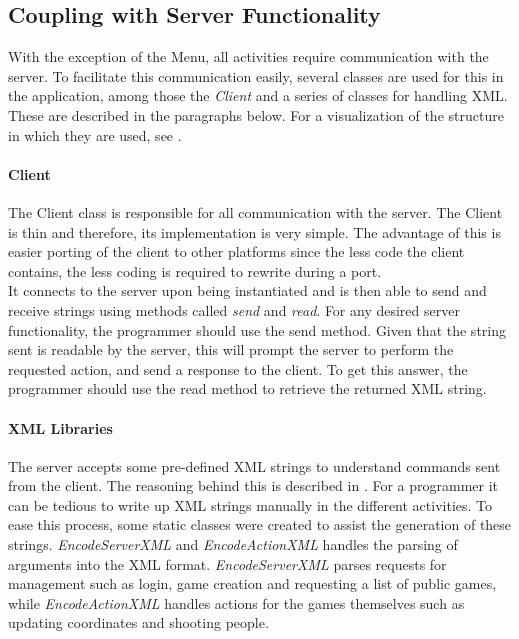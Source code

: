 \subsection{Coupling with Server Functionality} \label{subsec:server-coupling}
With the exception of the Menu, all activities require communication with the server. To facilitate this communication easily, several classes are used for this in the application, among those the \textit{Client} and a series of classes for handling XML. These are described in the paragraphs below. For a visualization of the structure in which they are used, see .

\paragraph{Client}
The Client class is responsible for all communication with the server. The Client is thin and therefore, its implementation is very simple. The advantage of this is easier porting of the client to other platforms since the less code the client contains, the less coding is required to rewrite during a port.\\

It connects to the server upon being instantiated and is then able to send and receive strings using methods called \textit{send} and \textit{read}. For any desired server functionality, the programmer should use the send method. Given that the string sent is readable by the server, this will prompt the server to perform the requested action, and send a response to the client. To get this answer, the programmer should use the read method to retrieve the returned XML string.

\paragraph{XML Libraries}
The server accepts some pre-defined XML strings to understand commands sent from the client. The reasoning behind this is described in . For a programmer it can be tedious to write up XML strings manually in the different activities. To ease this process, some static classes were created to assist the generation of these strings. \textit{EncodeServerXML} and \textit{EncodeActionXML} handles the parsing of arguments into the XML format. \textit{EncodeServerXML} parses requests for management such as login, game creation and requesting a list of public games, while \textit{EncodeActionXML} handles actions for the games themselves such as updating coordinates and shooting people.

